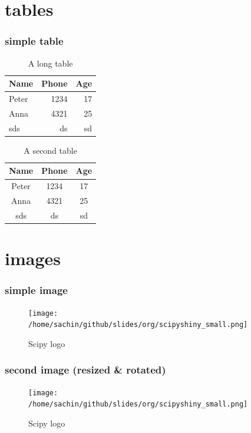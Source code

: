 \documentclass[bigger, presentation]{beamer}
\begin{document}
\section{tables}
\label{sec-3}
\begin{frame}
\frametitle{simple table}
\label{sec-3-1}



\begin{table}[htb]
\caption{A long table} \label{tab:long}
\begin{center}
\begin{tabular}{lrr}
\hline
 Name   &  Phone  &  Age  \\
\hline
 Peter  &   1234  &   17  \\
 Anna   &   4321  &   25  \\
\hline
 sds    &     ds  &   sd  \\
\hline
\end{tabular}
\end{center}
\end{table}



\begin{table}[htb]
\caption{A second table} 
\begin{center}
\begin{tabular}{c|c|c}
\hline
 Name   &  Phone  &  Age  \\
\hline
 Peter  &   1234  &   17  \\
 Anna   &   4321  &   25  \\
\hline
 sds    &     ds  &   sd  \\
\hline
\end{tabular}
\end{center}
\end{table}
\end{frame}
\section{images}
\label{sec-4}
\begin{frame}
\frametitle{simple image}
\label{sec-4-1}



  \begin{figure}[htb]
  \centering
  \texttt{[image: /home/sachin/github/slides/org/scipyshiny\_small.png]}
  \caption{\label{fig:SED-HR4049}Scipy logo}
  \end{figure}
\end{frame}
\begin{frame}
\frametitle{second image (resized \& rotated)}
\label{sec-4-2}


  \begin{figure}[htb]
  \centering
  \texttt{[image: /home/sachin/github/slides/org/scipyshiny\_small.png]}
  \caption{\label{fig:SED-HR4049}Scipy logo}
  \end{figure}
\end{frame}
\end{document}
